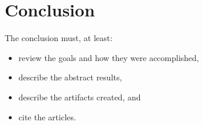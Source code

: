 \chapter{Conclusion}

The conclusion must, at least:
\begin{itemize}
    \item review the goals and how they were accomplished,
    \item describe the abstract results,
    \item describe the artifacts created, and
    \item cite the articles.
\end{itemize}